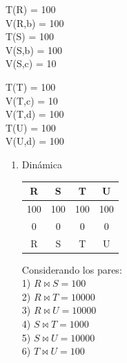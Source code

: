\documentclass{templateNote}
\begin{document}
\begin{enumerate}
\begin{enumerate}[label=\alph*)]
        \begin{center}
            \begin{minipage}{0.3\textwidth}
                T(R) = 100 \\
                V(R,b) = 100 \\
                T(S) = 100 \\
                V(S,b) = 100 \\
                V(S,c) = 10 \\
                \end{minipage}%
                \begin{minipage}{0.3\textwidth}
                T(T) = 100 \\
                V(T,c) = 10 \\
                V(T,d) = 100 \\
                T(U) = 100 \\
                V(U,d) = 100 \\
            \end{minipage}
        \end{center}    

        \begin{enumerate}[label=\alph*)]
            \item Dinámica \\
            
                \begin{center}
                    \begin{tabular}{|c|c|c|c|}
                        \hline
                        R & S & T & U \\
                        \hline
                        100 & 100 & 100 & 100 \\
                        \hline
                        0 & 0 & 0 & 0 \\
                        \hline
                        R & S & T & U \\
                        \hline
                    \end{tabular}
                \end{center}

                Considerando los pares: \\

                1) $R \Join S = 100$ \\
                2) $R \Join T = 10000$ \\
                3) $R \Join U = 10000$ \\
                4) $S \Join T = 1000$ \\
                5) $S \Join U = 10000$ \\
                6) $T \Join U = 100$ \\


\end{enumerate}
\end{enumerate}
\end{enumerate}
\end{document}
